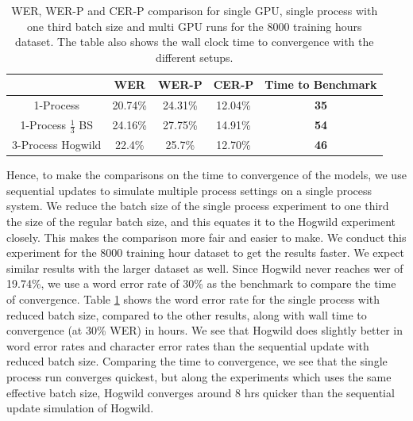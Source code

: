 \begin{table}[ht]
\centering
\begin{tabular}{c | c c c | c }
\hline
     & WER & WER-P & CER-P & Time to Benchmark\\
 \hline
  1-Process & 20.74\% & 24.31\% & 12.04\% & \textbf{35} \\
  1-Process $\frac{1}{3}$ BS & 24.16\% & 27.75\% & 14.91\% & \textbf{54} \\
  3-Process Hogwild & 22.4\% & 25.7\% & 12.70\% & \textbf{46} \\
 \hline
\end{tabular}
\caption{\label{table:wer_hog_seq} WER, WER-P and CER-P comparison for single GPU, single process with one third batch size and multi GPU runs for the 8000 training hours dataset. The table also shows the wall clock time to convergence with the different setups.}
\end{table}

Hence, to make the comparisons on the time to convergence of the models, we use sequential updates to simulate multiple process settings on a single process system. We reduce the batch size of the single process experiment to one third the size of the regular batch size, and this equates it to the Hogwild experiment closely. This makes the comparison more fair and easier to make. We conduct this experiment for the 8000 training hour dataset to get the results faster.  We expect similar results with the larger dataset as well. Since Hogwild never reaches \acrshort{wer} of 19.74\%, we use a word error rate of 30\% as the benchmark to compare the time of convergence. Table \ref{table:wer_hog_seq} shows the word error rate for the single process with reduced batch size, compared to the other results, along with  wall time to convergence (at 30\% WER) in hours. We see that Hogwild does slightly better in word error rates and character error rates than the sequential update with reduced batch size. Comparing the time to convergence, we see that the single process run converges quickest, but along the experiments which uses the same effective batch size, Hogwild converges around 8 hrs quicker than the sequential update simulation of Hogwild. 

